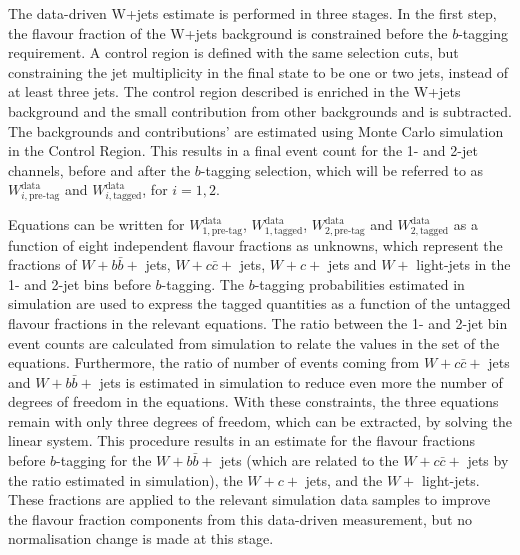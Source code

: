 The data-driven W+jets estimate is performed in three stages. In the first step, the flavour fraction of the W+jets background is constrained before the $b$-tagging
requirement.
A control region is defined 
with the same selection cuts, but constraining the jet multiplicity in the final state to be one or two jets, instead of at least 
three jets. The control region described is enriched in the W+jets background and the small contribution from other backgrounds
and \ttbar is subtracted. The backgrounds and \ttbar contributions' are estimated using Monte Carlo simulation in
the Control Region. This results in
a final event count for the 1- and 2-jet channels, before and after the $b$-tagging selection, which will be referred to as $W^{\textrm{data}}_{i, \textrm{pre-tag}}$ and
$W^{\textrm{data}}_{i, \textrm{tagged}}$, for $i = 1,2$.

Equations can be written for $W^{\textrm{data}}_{1, \textrm{pre-tag}}$, $W^{\textrm{data}}_{1, \textrm{tagged}}$, $W^{\textrm{data}}_{2, \textrm{pre-tag}}$ and $W^{\textrm{data}}_{2, \textrm{tagged}}$ as a function
of eight independent flavour fractions as unknowns, which represent the fractions of $W+b\bar{b}+$ jets, $W+c\bar{c}+$ jets, $W+c+$ jets and
$W+$ light-jets in the 1- and 2-jet bins
before $b$-tagging. The $b$-tagging probabilities estimated in simulation are used to express the tagged quantities as a function of the untagged flavour fractions in the
relevant equations. The ratio between the 1- and 2-jet bin event counts are calculated from simulation to relate the values in the set of the equations. Furthermore,
the ratio of number of events coming from $W+c\bar{c}+$ jets and $W+b\bar{b}+$ jets is estimated in simulation to reduce even more the number of degrees of freedom in the
equations. With these constraints, the three equations remain with only three degrees of freedom, which can be extracted, by solving the linear system.
This procedure results in an estimate for the flavour fractions before $b$-tagging
for the $W+b\bar{b}+$ jets (which are related to the $W+c\bar{c}+$ jets by the ratio estimated in simulation), the $W+c+$ jets,
and the $W+$ light-jets. These fractions are applied to the relevant simulation data samples to improve the flavour fraction components from this data-driven measurement,
but no normalisation change is made at this stage.

